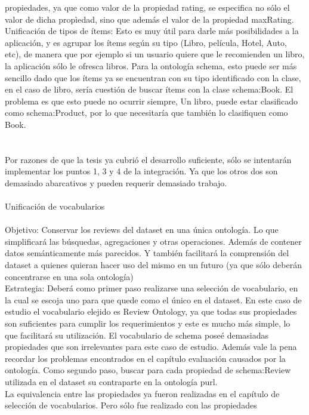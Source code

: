 propiedades, ya que como valor de la propiedad rating, se especifica no sólo el valor de dicha propìedad, sino que además el valor de la 
propiedad maxRating. \\
Unificación de tipos de ítems: Esto es muy útil para darle más posibilidades a la aplicación, y es agrupar los ítems según su tipo 
(Libro, película, Hotel, Auto, etc), de manera que por ejemplo si un usuario quiere que le recomienden un libro, la aplicación sólo 
le ofresca libros. Para la ontología schema, esto puede ser más sencillo dado que los ítems ya se encuentran con su tipo identificado con 
la clase, en el caso de libro, sería cuestión de buscar ítems con la clase schema:Book. El problema es que esto puede no ocurrir siempre, 
Un libro, puede estar clasificado como schema:Product, por lo que necesitaría que también lo clasifiquen como Book.\\
\\
\\
Por razones de que la tesis ya cubrió el desarrollo suficiente, sólo se intentarán implementar los puntos 1, 3 y 4 de la integración. Ya que 
los otros dos son demasiado abarcativos y pueden requerir demasiado trabajo.\\
\\
Unificación de vocabularios\\
\\
Objetivo: Conservar los reviews del dataset en una única ontología. Lo que simplificará las búsquedas, agregaciones y otras operaciones.
Además de contener datos semánticamente más parecidos. Y también facilitará la comprensión del dataset a quienes quieran hacer uso del mismo
en un futuro (ya que sólo deberán concentrarse en una sola ontología)
\\
Estrategia: Deberá como primer paso realizarse una selección de vocabulario, en la cual se escoja uno para que quede como el único en el dataset.
En este caso de estudio el vocabulario elejido es Review Ontology, ya que todas sus propiedades son suficientes para cumplir los requerimientos y 
este es mucho más simple, lo que facilitará su utilización. El vocabulario de schema poseé demasiadas propiedades que son irrelevantes para este caso de estudio. 
Además vale la pena recordar los problemas encontrados en el capítulo evaluación causados por la ontología.
Como segundo paso, buscar para cada propiedad de schema:Review utilizada en el dataset su contraparte en la ontología purl.\\
La equivalencia entre las propiedades ya fueron realizadas en el capítulo de selección de vocabularios. Pero sólo fue realizado con las propiedades 
